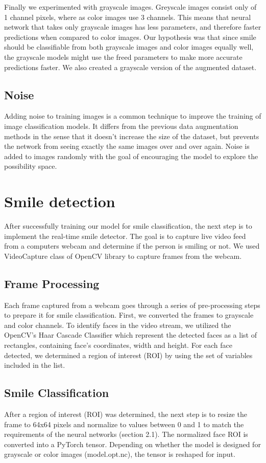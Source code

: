 \documentclass[12pt,a4paper,english
]{tunithesis}
\begin{document}
Finally we experimented with grayscale images. Greyscale images consist only of 1 channel pixels, where as color images use 3 channels. This means that neural network that takes only grayscale images has less parameters, and therefore faster predictions when compared to color images. Our hypothesis was that since smile should be classifiable from both grayscale images and color images equally well, the grayscale models might use the freed parameters to make more accurate predictions faster. We also created a grayscale version of the augmented dataset.

\subsection{Noise}
\label{sec:noise}
Adding noise to training images is a common technique to improve the training of image classification models. It differs from the previous data augmentation methods in the sense that it doesn't increase the size of the dataset, but prevents the network from seeing exactly the same images over and over again. Noise is added to images randomly with the goal of encouraging the model to explore the possibility space.\cite{dlbook}

\section{Smile detection}
After successfully training our model for smile classification, the next step is to implement the real-time smile detector. The goal is to capture live video feed from a computers webcam and determine if the person is smiling or not. We used VideoCapture class of OpenCV library to capture frames from the webcam. 

\subsection{Frame Processing}
Each frame captured from a webcam goes through a series of pre-processing steps to prepare it for smile classification. First, we converted the frames to grayscale and color channels. To identify faces in the video stream, we utilized the OpenCV's Haar Cascade Classifier which represent the detected faces as a list of rectangles, containing face's coordinates, width and height. For each face detected, we determined a region of interest (ROI) by using the set of variables included in the list.

\subsection{Smile Classification}
After a region of interest (ROI) was determined, the next step is to resize the frame to 64x64 pixels and normalize to values between 0 and 1 to match the requirements of the neural networks (section 2.1). The normalized face ROI is converted into a PyTorch tensor. Depending on whether the model is designed for grayscale or color images (model.opt.nc), the tensor is reshaped for input.
\end{document}
